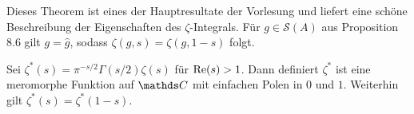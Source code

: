 Dieses Theorem ist eines der Hauptresultate der Vorlesung und liefert eine schöne Beschreibung der Eigenschaften des $\zeta$-Integrals.
Für $g \in \mathcal{S}(A)$ aus Proposition 8.6 gilt $g=\hat{g}$,
sodass $\zeta(g,s)=\zeta(g,1-s)$ folgt.
\begin{prop}
Sei $\zeta^\ast(s)=\pi^{-s/2} \Gamma(s/2)\zeta(s)$ für $\operatorname{Re}(s)>1$.
Dann definiert $\zeta^\ast$ ist eine meromorphe Funktion auf $\C$ mit einfachen Polen in $0$ und $1$.
Weiterhin gilt $\zeta^\ast(s)=\zeta^\ast(1-s)$.
\end{prop}